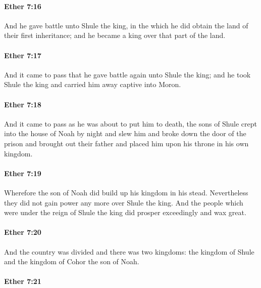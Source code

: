 		\paragraph{Ether 7:16} %
			\label{ETHER-7-16}

			And he gave battle unto Shule the king,
			in the which he did obtain the land of their first inheritance;
			and he became a king over that part of the land.

		\paragraph{Ether 7:17} %
			\label{ETHER-7-17}

			And it came to pass that he gave battle again unto Shule the king;
			and he took Shule the king and carried him away captive into Moron.

		\paragraph{Ether 7:18} %
			\label{ETHER-7-18}

			And it came to pass as he was about to put him to death,
			the sons of Shule crept into the house of Noah by night and slew him
			and broke down the door of the prison and brought out their father
			and placed him upon his throne in his own kingdom.

		\paragraph{Ether 7:19} %
			\label{ETHER-7-19}

			Wherefore the son of Noah did build up his kingdom in his stead.
			Nevertheless they did not gain power any more over Shule the king.
			And the people which were under the reign of Shule the king
			did prosper exceedingly and wax great.

		\paragraph{Ether 7:20} %
			\label{ETHER-7-20}

			And the country was divided and there was two kingdoms:
			the kingdom of Shule and the kingdom of Cohor the son of Noah.

		\paragraph{Ether 7:21} %
			\label{ETHER-7-21}

